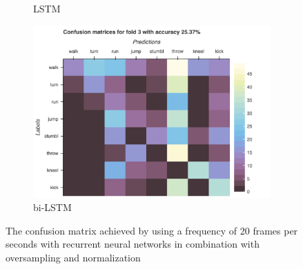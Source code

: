 \begin{figure}[H]
\begin{subfigure}[b]{0.49\textwidth}
				\caption{LSTM}
			\end{subfigure}
			\hfill
			\begin{subfigure}[b]{0.49\textwidth}
				\centering
				\includegraphics[width=\textwidth]{img/bi-LSTM-Confusion_matrix_drop.png}
				\caption{bi-LSTM}
			\end{subfigure}
			\caption{The confusion matrix achieved by using a frequency of 20 frames per seconds with recurrent neural networks in combination with oversampling and normalization}
			\label{fig:freq_5_seq}
		\end{figure}
